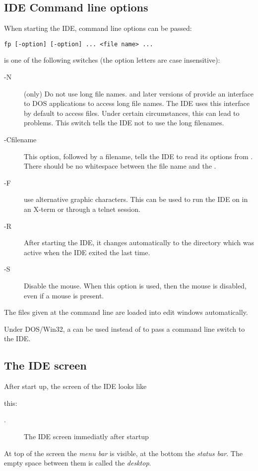 \subsection{IDE Command line options}
When starting the IDE, command line options can be passed:
\begin{verbatim}
fp [-option] [-option] ... <file name> ...
\end{verbatim}
 is one of the following switches (the option letters
are case insensitive):
\begin{description}
\item [-N] (\dos only) Do not use long file names.  and later
versions of \windows provide an interface to DOS applications to access 
long file names. 
The IDE uses this interface by default to access files. Under certain 
circumstances, this can lead to problems. This switch tells the IDE not to
use the long filenames.
\item [-Cfilename] This option, followed by a filename, tells the IDE to
read its options from . There should be no whitespace between
the file name and the .
\item [-F] use alternative graphic characters. This can be used to run the
IDE on \linux in an X-term or through a telnet session.
\item [-R] After starting the IDE, it changes automatically to the directory
which was active when the IDE exited the last time.
\item [-S] Disable the mouse. When this option is used, then the mouse is
disabled, even if a mouse is present.
\end{description}
The files given at the command line are loaded into edit windows automatically.

\begin{remark}
Under DOS/Win32, a \var{/} can be used instead of \var{-} to pass a
command line switch to the IDE.
\end{remark}

\subsection{The IDE screen}

After start up, the screen of the IDE looks like 
\begin{htmlonly}
this:
\end{htmlonly}
\begin{latexonly}
.
\begin{figure}
\caption{The IDE screen immediatly after startup}
\label{fig:idestart}
\ifpdf
{}
\else
{}
\fi
\end{figure}
\end{latexonly}
At top of the screen the \emph{menu bar} is visible, at the bottom
the \emph{status bar}. The empty space between them is called the
\emph{desktop}.

